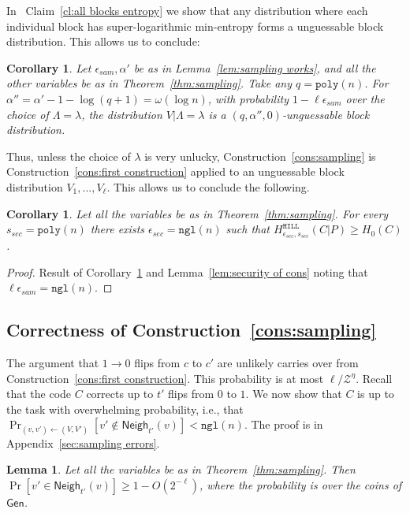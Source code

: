 \documentclass[11pt]{article}
\newcommand{\apref}[1]{\mbox{Appendix~\ref{#1}}}
\newcommand{\thref}[1]{\mbox{Theorem~\ref{#1}}}
\newcommand{\corref}[1]{\mbox{Corollary~\ref{#1}}}
\newcommand{\lemref}[1]{\mbox{Lemma~\ref{#1}}}
\newcommand{\clref}[1]{\mbox{Claim~\ref{#1}}}
\newcommand{\consref}[1]{\mbox{Construction~\ref{#1}}}
\newcommand{\class}[1]{{\ensuremath{\mathsf{#1}}}}
\newcommand{\gen}{\ensuremath{\class{Gen}}\xspace}
\newcommand{\neigh}{\ensuremath{\class{Neigh}}\xspace}
\newcommand{\hill}{\ensuremath{\mathtt{HILL}}\xspace}
\newcommand{\poly}{\ensuremath{\mathtt{poly}}\xspace}
\newcommand{\ngl}{\ensuremath{\mathtt{ngl}}\xspace}
\newtheorem{lemma}[theorem]{Lemma}
\newtheorem{corollary}[theorem]{Corollary}
\begin{document}
In ~\clref{cl:all blocks entropy} we show that any distribution where each individual block has super-logarithmic min-entropy forms a unguessable block distribution.  This allows us to conclude:
\begin{corollary}
\label{cor:v are unguessable}
Let $\epsilon_{sam}, \alpha'$ be as in \lemref{lem:sampling works},  and all the other variables be as in \thref{thm:sampling}. Take any $q=\poly(n)$.  For $\alpha'' =\alpha'-1-\log (q+1) =  \omega(\log n)$, with  probability $1-\ell \epsilon_{sam}$ over the choice of $\Lambda=\lambda$, the distribution $V| \Lambda=\lambda$ is a $(q, \alpha'', 0)$-unguessable block distribution.
\end{corollary}


Thus, unless the choice of $\lambda$ is very unlucky,
\consref{cons:sampling} is \consref{cons:first construction} applied to an unguessable block distribution $V_1,..., V_\ell$. This allows us to conclude the following.
\begin{corollary}
\label{cor:samp unguess}
Let all the variables be as in \thref{thm:sampling}.
For every $s_{sec} = \poly(n)$ there exists $\epsilon_{sec} = \ngl(n)$ such that $H^{\hill}_{\epsilon_{sec}, s_{sec}}(C | P) \geq H_0(C)$. %
\end{corollary}
\begin{proof}
Result of \corref{cor:v are unguessable} and \lemref{lem:security of cons} noting that $\ell \epsilon_{sam} = \ngl(n)$.
\end{proof}

\subsection{Correctness of \consref{cons:sampling}}
\label{sec:correct sampling}
The argument that $1\rightarrow 0$ flips from $c$ to $c'$ are unlikely carries over from \consref{cons:first construction}.  This probability is at most $\ell/\mathcal{Z}^\eta$.   Recall that the code $C$ corrects up to $t'$ flips from $0$ to $1$. We now show that $C$ is up to the task with overwhelming probability, i.e., that  $\Pr_{(v, v')\leftarrow (V, V')}[v'\not\in\neigh_{t'}(v)] <\ngl(n)$.  The proof is in \apref{sec:sampling errors}.


\begin{lemma}
\label{lem:sampling errors}
Let all the variables be as in \thref{thm:sampling}.
 Then $\Pr[v'\in\neigh_{t'}(v)]\geq 1-O(2^{-\ell})$, where the probability is over the coins of $\gen$.  %
\end{lemma}
\end{document}
